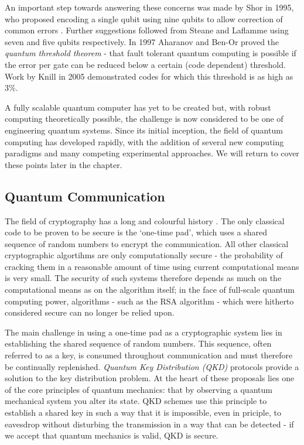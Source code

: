 An important step towards answering these concerns was made by Shor in 1995, who proposed encoding a single qubit using nine qubits to allow correction of common errors \cite{shor_codes_95}. Further suggestions followed from Steane and Laflamme \cite{steane_code_96, steane_code_96_2, laflamme_5_code} using seven and five qubits respectively. In 1997 Aharanov and Ben-Or proved the \textit{quantum threshold theorem} \cite{quantum_threshold_theorem} - that fault tolerant quantum computing is possible if the error per gate can be reduced below a certain (code dependent) threshold. Work by Knill in 2005 \cite{knill_correction} demonstrated codes for which this threshold is as high as 3\%. 

A fully scalable quantum computer has yet to be created but, with robust computing theoretically possible, the challenge is now considered to be one of engineering quantum systems. Since its initial inception, the field of quantum computing has developed rapidly, with the addition of several new computing paradigms and many competing experimental approaches. We will return to cover these points later in the chapter.

\subsection{Quantum Communication}

The field of cryptography has a long and colourful history \cite{the_code_book}. The only classical code to be proven to be secure is the `one-time pad', which uses a shared sequence of random numbers to encrypt the communication. All other classical cryptographic algortihms are only computationally secure - the probability of cracking them in a reasonable amount of time using current computational means is very small. The security of such systems therefore depends as much on the computational means as on the algorithm itself; in the face of  full-scale quantum computing power, algorithms - such as the RSA algorithm - which were hitherto considered secure can no longer be relied upon.

The main challenge in using a one-time pad as a cryptographic system lies in establishing the shared sequence of random numbers. This sequence, often referred to as a key, is consumed throughout communication and must therefore be continually replenished. \textit{Quantum Key Distribution (QKD)} protocols provide a solution to the key distribution problem. At the heart of these proposals lies one of the core principles of quantum mechanics: that by observing a quantum mechanical system you alter its state. QKD schemes use this principle to establish a shared key in such a way that it is impossible, even in priciple, to eavesdrop without disturbing the transmission in a way that can be detected - if we accept that quantum mechanics is valid, QKD is secure.

